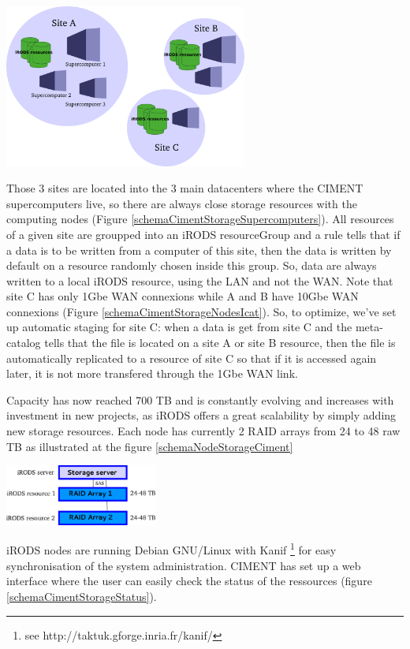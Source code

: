 \documentclass[a4paper, 10pt]{article}
\begin{document}
\begin{multicols}{2}
\begin{center}%
\centering
{}
\includegraphics[width=8cm]{schemaCimentStorageSupercomputers.png}
\end{center}
Those 3 sites are located into the 3 main datacenters where the CIMENT supercomputers live, so there are always close storage resources with the computing nodes (Figure \ref{schemaCimentStorageSupercomputers}). All resources of a given site are groupped into an iRODS resourceGroup and a rule tells that if a data is to be written from a computer of this site, then the data is written by default on a resource randomly chosen inside this group. So, data are always written to a local iRODS resource, using the LAN and not the WAN.
Note that site C has only 1Gbe WAN connexions while A and B have 10Gbe WAN connexions (Figure \ref{schemaCimentStorageNodesIcat}). So, to optimize, we've set up automatic staging for site C: when a data is get from site C and the meta-catalog tells that the file is located on a site A or site B resource, then the file is automatically replicated to a resource of site C so that if it is accessed again later, it is not more transfered through the 1Gbe WAN link. 

Capacity has now reached 700 TB and is constantly evolving and increases with investment in new projects, as iRODS offers a great scalability by simply adding new storage resources.
Each node has currently 2 RAID arrays from 24 to 48 raw TB as illustrated at the figure \ref{schemaNodeStorageCiment}

\begin{center}%
\centering
{}
\includegraphics[width=5cm]{schemaNodeStorageCiment.png}
\end{center}
iRODS nodes are running Debian GNU/Linux with Kanif \footnote{see http://taktuk.gforge.inria.fr/kanif/} for easy synchronisation of the system administration.
CIMENT has set up a web interface where the user can easily check the status of the ressources (figure \ref{schemaCimentStorageStatus}).


\end{multicols}
\end{document}
